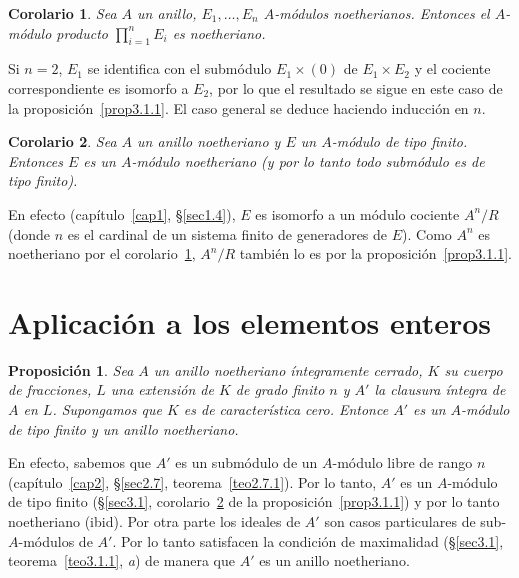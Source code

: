 \documentclass[bibtotoc,leqno,spanish]{amsbook}
\numberwithin{equation}{section}
\theoremstyle{note}
\theoremstyle{note}
\newtheorem{proposition}{Proposici\'on}
\newtheorem{corollary}{Corolario}
\theoremstyle{rem}
\numberwithin{theorem}{section}
\numberwithin{proposition}{section}
\numberwithin{definition}{section}
\numberwithin{lemma}{section}
\numberwithin{corollary}{section}
\numberwithin{example}{section}
\numberwithin{footnote}{section}%
\begin{document}
\begin{corollary}\label{cor3.1.1}
Sea $A$ un anillo, $E_{1},\dots,E_{n}$ $A$-m\'odulos noetherianos. Entonces el $A$-m\'odulo
producto $\prod_{i=1}^{n}E_{i}$ es noetheriano.
\end{corollary}

Si $n=2$, $E_{1}$ se identifica con el subm\'odulo $E_{1}\times(0)$ de $E_{1}\times E_{2}$ y el
cociente correspondiente es isomorfo a $E_{2}$, por lo que el resultado se sigue en este caso
de la proposici\'on~\ref{prop3.1.1}. El caso general se deduce haciendo inducci\'on en $n$.

\begin{corollary}\label{cor3.1.2}
Sea $A$ un anillo noetheriano y $E$ un $A$-m\'odulo de tipo finito. Entonces $E$ es un
$A$-m\'odulo noetheriano {\upshape(}y por lo tanto todo subm\'odulo es de tipo finito{\upshape).}
\end{corollary}

En efecto (cap\'itulo~\ref{cap1}, \S\ref{sec1.4}), $E$ es isomorfo a un m\'odulo cociente $A^{n}/R$ (donde
$n$ es el cardinal de un sistema finito de generadores de $E$). Como $A^{n}$ es noetheriano
por el corolario~\ref{cor3.1.1}, $A^{n}/R$ tambi\'en lo es por la proposici\'on~\ref{prop3.1.1}.

\section{Aplicaci\'on a los elementos enteros}\label{sec3.2}

\begin{proposition}
Sea $A$ un anillo noetheriano \'integramente cerrado, $K$ su cuerpo de fracciones,
$L$ una extensi\'on de $K$ de grado finito $n$ y $A'$ la clausura \'integra de $A$ en
$L$. Supongamos que $K$ es de caracter\'istica cero. Entonce $A'$ es un $A$-m\'odulo de tipo finito
y un anillo noetheriano.
\end{proposition}

En efecto, sabemos que $A'$ es un subm\'odulo de un $A$-m\'odulo libre de rango $n$
(cap\'itulo~\ref{cap2}, \S\ref{sec2.7}, teorema~\ref{teo2.7.1}). Por lo tanto, $A'$ es un $A$-m\'odulo de tipo finito
(\S\ref{sec3.1}, corolario~\ref{cor3.1.2} de la proposici\'on~\ref{prop3.1.1}) y por lo tanto noetheriano (ibid). Por otra parte los ideales
de $A'$ son casos particulares de sub-$A$-m\'odulos de $A'$. Por lo tanto satisfacen la condici\'on
de maximalidad (\S\ref{sec3.1}, teorema~\ref{teo3.1.1}, {\itshape a}) de manera que $A'$ es un anillo noetheriano.
\end{document}
